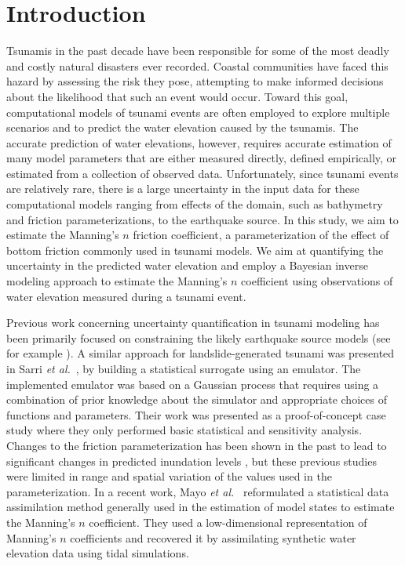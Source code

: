 \documentclass[review,12pt]{elsarticle}
\begin{document}
% 


\section{Introduction} \label{sec:intro}

Tsunamis in the past decade have been responsible for some of the most  deadly
and costly natural disasters ever recorded. Coastal communities have faced this
hazard by assessing the risk they pose, attempting  to make informed decisions
about the likelihood that such an event would  occur.
Toward this goal, computational models of  tsunami events are often
employed to explore multiple scenarios and to predict the water elevation
caused by the tsunamis. The accurate prediction  of water elevations, however,
requires accurate estimation of many model parameters that are either measured
directly, defined empirically, or estimated from a collection of observed data.
Unfortunately, since tsunami events are relatively rare,  there is a large
uncertainty in the input data for these computational  models ranging from
effects of the domain, such as bathymetry and friction parameterizations,  to
the earthquake source.  In this study, we aim to estimate the Manning's $n$
friction coefficient, a parameterization of the effect of bottom friction 
commonly used in tsunami models.  We aim at quantifying the uncertainty in the 
predicted water elevation  and employ a Bayesian inverse modeling approach to 
estimate the Manning's $n$ coefficient using observations of water elevation 
measured during a tsunami event.

Previous work concerning uncertainty quantification in tsunami modeling has been primarily 
focused on constraining the likely earthquake source models (see
for example \cite{MacInnes:2013cr}).  A similar approach for landslide-generated
tsunami was presented in Sarri \emph{et al.}~\cite{Sarri2012}, by building a statistical surrogate
using an emulator. The implemented emulator was based on a Gaussian
process that requires using a combination of prior knowledge about the simulator
and appropriate choices of functions and parameters. Their work was presented as
a proof-of-concept case study where they only performed basic statistical and
sensitivity analysis.  Changes to the friction parameterization has been shown in 
the past to lead to significant changes in predicted inundation levels \cite{Myers:2001el, 
Jakeman:2010hk}, but these previous studies were limited in range and spatial variation of the values used in the parameterization.  
In a recent work, Mayo \emph{et al.}~\cite{Mayo:2014} reformulated a statistical data assimilation method
generally used in the estimation of model states to estimate the Manning's $n$
coefficient. They used a low-dimensional representation of
Manning's $n$ coefficients and recovered it by assimilating synthetic water elevation data using tidal simulations.
\end{document}
